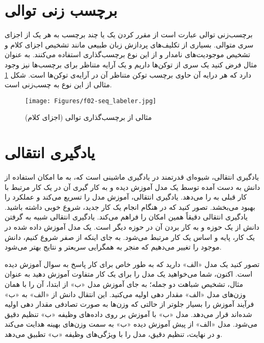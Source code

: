 \section{برچسب زنی توالی}
\hspace{30pt}
برچسب‌زنی توالی عبارت است از مقرر کردن یک یا چند برچسب به هر یک از اجزای سری متوالی. بسیاری از تکلیف‌های پردازش زبان طبیعی مانند تشخیص اجزای کلام و تشخیص موجودیت‌های نامدار و از این نوع برچسب‌گذاری استفاده می‌کنند.
به عنوان مثال فرض کنید یک سری از توکن‌ها داریم و یک آرایه متناظر برای برچسب‌ها نیز وجود دارد که هر درایه آن حاوی برچسب توکن متناظر آن در آرایه‌ى توکن‌ها است. شکل \ref{fig:seq_labeler} مثالی از این نوع به چسب‌زنی است.\cite{jurafsky2024speech}
\begin{figure}[H]
      \centering
      \texttt{[image: Figures/f02-seq\_labeler.jpg]}
      \caption{مثالی از برچسب‌گذاری توالی (اجزای کلام)}
      \label{fig:seq_labeler}
  \end{figure}

\section{یادگیری انتقالی}
\hspace{30pt}
یادگیری انتقالی، شیوه‌ای قدرتمند در یادگیری ماشینی است که، به ما امکان استفاده از دانش به دست آمده توسط یک مدل آموزش دیده و به کار گیری آن  در یک کار مرتبط با کار قبلی به را می‌دهد. یادگیری انتقالی، آموزش مدل را تسریع می‌کند و عملکرد را بهبود می‌بخشد. تصور کنید که در هنگام انجام یک کار جدید، شروع خوبی داشته باشید. یادگیری انتقالی دقیقاً همین امکان را فراهم می‌کند. یادگیری انتقالی شبیه به گرفتن دانش از یک حوزه و به کار بردن آن در حوزه دیگر است. یک مدل آموزش داده شده در یک کار، پایه و اساس یک کار مرتبط می‌شود. به جای اینکه از صفر شروع کنیم، دانش موجود را تغییر می‌دهیم که منجر به همگرایی سریعتر و نتایج بهتر می‌شود.

تصور کنید یک مدل «الف» دارید که به طور خاص برای کار پاسخ به سوال آموزش دیده است.
اکنون، شما‌ می‌خواهید یک مدل را برای یک کار متفاوت آموزش دهید به عنوان مثال، تشخیص شباهت دو جمله؛ به جای آموزش مدل «ب» از ابتدا، آن را با همان وزن‌های مدل «الف» مقدار دهی اولیه می‌کنید. این انتقال دانش از «الف» به «ب» فرآیند آموزش را بسیار جلوتر از حالتی که وزن‌ها به صورت تصادفی مقدار دهی اولیه شده‌اند قرار می‌دهد. مدل «ب» با آموزش بر روی داده‌های وظیفه «ب» تنظیم دقیق‌ ‌می‌شود. مدل «الف» از پیش آموزش دیده «ب» به سمت وزن‌های بهینه هدایت می‌کند و در نهایت، تنظیم دقیق، مدل را با ویژگی‌های وظیفه «ب» تطبیق می‌دهد.

